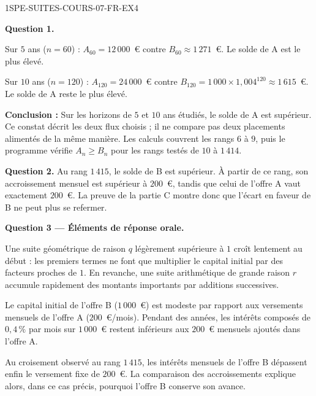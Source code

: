 \begin{corrige}{1SPE-SUITES-COURS-07-FR-EX4}

\textbf{Question 1.}

Sur $5$ ans ($n = 60$) : $A_{60} = 12\,000$~€ contre
$B_{60} \approx 1\,271$~€. Le solde de A est le plus élevé.

Sur $10$ ans ($n = 120$) : $A_{120} = 24\,000$~€ contre
$B_{120} = 1\,000 \times 1{,}004^{120} \approx 1\,615$~€. Le solde de A reste
le plus élevé.


\textbf{Conclusion :} Sur les horizons de $5$ et $10$ ans étudiés, le solde de
A est supérieur. Ce constat décrit les deux flux choisis ; il ne compare pas
deux placements alimentés de la même manière. Les calculs couvrent les rangs
$6$ à $9$, puis le programme vérifie $A_n\geqslant B_n$ pour les rangs testés
de $10$ à $1\,414$.

\textbf{Question 2.} Au rang $1\,415$, le solde de B est supérieur. À partir de ce
rang, son accroissement mensuel est supérieur à $200$~€, tandis que celui de
l'offre A vaut exactement $200$~€. La preuve de la partie C montre donc que
l'écart en faveur de B ne peut plus se refermer.

\textbf{Question 3 — Éléments de réponse orale.}

Une suite géométrique de raison $q$ légèrement supérieure à $1$ croît lentement au début : les premiers termes ne font que multiplier le capital initial par des facteurs proches de $1$. En revanche, une suite arithmétique de grande raison $r$ accumule rapidement des montants importants par additions successives.

Le capital initial de l'offre B ($1\,000$~€) est modeste par rapport aux versements mensuels de l'offre A ($200$~€/mois). Pendant des années, les intérêts composés de $0{,}4\,\%$ par mois sur $1\,000$~€ restent inférieurs aux $200$~€ mensuels ajoutés dans l'offre A.

Au croisement observé au rang $1\,415$, les intérêts mensuels de l'offre B
dépassent enfin le versement fixe de $200$~€. La comparaison des accroissements
explique alors, dans ce cas précis, pourquoi l'offre B conserve son avance.

\end{corrige}
